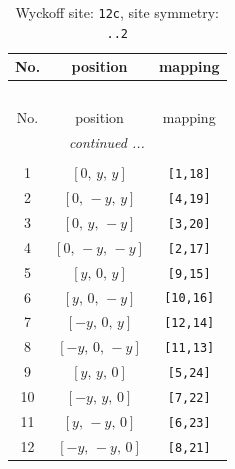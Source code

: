 \documentclass[fleqn,8pt]{jsarticle}
\begin{document}
\begin{longtable}{ccc}
\caption{Wyckoff site: {\tt 12c}, site symmetry: {\tt ..2}}
 \\
 \hline \hline
No. & position & mapping \\ \hline \endfirsthead

\multicolumn{2}{l}{\tablename\ \thetable{}} \\
 \hline \hline
No. & position & mapping \\ \hline \endhead

 \hline \hline
\multicolumn{2}{r}{\footnotesize\it continued ...} \\ \endfoot

 \hline \hline
\multicolumn{2}{r}{} \\ \endlastfoot

1 & $\left[ 0,\, y,\, y \right]$ & {\tt [1,18]} \\ \hline
2 & $\left[ 0,\, - y,\, y \right]$ & {\tt [4,19]} \\ \hline
3 & $\left[ 0,\, y,\, - y \right]$ & {\tt [3,20]} \\ \hline
4 & $\left[ 0,\, - y,\, - y \right]$ & {\tt [2,17]} \\ \hline
5 & $\left[ y,\, 0,\, y \right]$ & {\tt [9,15]} \\ \hline
6 & $\left[ y,\, 0,\, - y \right]$ & {\tt [10,16]} \\ \hline
7 & $\left[ - y,\, 0,\, y \right]$ & {\tt [12,14]} \\ \hline
8 & $\left[ - y,\, 0,\, - y \right]$ & {\tt [11,13]} \\ \hline
9 & $\left[ y,\, y,\, 0 \right]$ & {\tt [5,24]} \\ \hline
10 & $\left[ - y,\, y,\, 0 \right]$ & {\tt [7,22]} \\ \hline
11 & $\left[ y,\, - y,\, 0 \right]$ & {\tt [6,23]} \\ \hline
12 & $\left[ - y,\, - y,\, 0 \right]$ & {\tt [8,21]} \\
\end{longtable}
\renewcommand{\arraystretch}{1.2}
\end{document}
